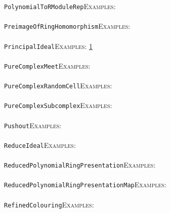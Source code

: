 \documentclass[a4paper,11pt]{report}
\begin{document}
{{ \texttt{PolynomialToRModuleRep}{\nobreakspace}{\nobreakspace}{\nobreakspace}{\nobreakspace}\textsc{Examples:} \\
 \\
 \texttt{PreimageOfRingHomomorphism}{\nobreakspace}{\nobreakspace}{\nobreakspace}{\nobreakspace}\textsc{Examples:} \\
 \\
 \texttt{PrincipalIdeal}{\nobreakspace}{\nobreakspace}{\nobreakspace}{\nobreakspace}\textsc{Examples:} \href{tutorial/chap10.html} {1}{\nobreakspace} \\
 \\
 \texttt{PureComplexMeet}{\nobreakspace}{\nobreakspace}{\nobreakspace}{\nobreakspace}\textsc{Examples:} \\
 \\
 \texttt{PureComplexRandomCell}{\nobreakspace}{\nobreakspace}{\nobreakspace}{\nobreakspace}\textsc{Examples:} \\
 \\
 \texttt{PureComplexSubcomplex}{\nobreakspace}{\nobreakspace}{\nobreakspace}{\nobreakspace}\textsc{Examples:} \\
 \\
 \texttt{Pushout}{\nobreakspace}{\nobreakspace}{\nobreakspace}{\nobreakspace}\textsc{Examples:} \\
 \\
 \texttt{ReduceIdeal}{\nobreakspace}{\nobreakspace}{\nobreakspace}{\nobreakspace}\textsc{Examples:} \\
 \\
 \texttt{ReducedPolynomialRingPresentation}{\nobreakspace}{\nobreakspace}{\nobreakspace}{\nobreakspace}\textsc{Examples:} \\
 \\
 \texttt{ReducedPolynomialRingPresentationMap}{\nobreakspace}{\nobreakspace}{\nobreakspace}{\nobreakspace}\textsc{Examples:} \\
 \\
 \texttt{RefinedColouring}{\nobreakspace}{\nobreakspace}{\nobreakspace}{\nobreakspace}\textsc{Examples:} \\
 \\
}}
\end{document}
